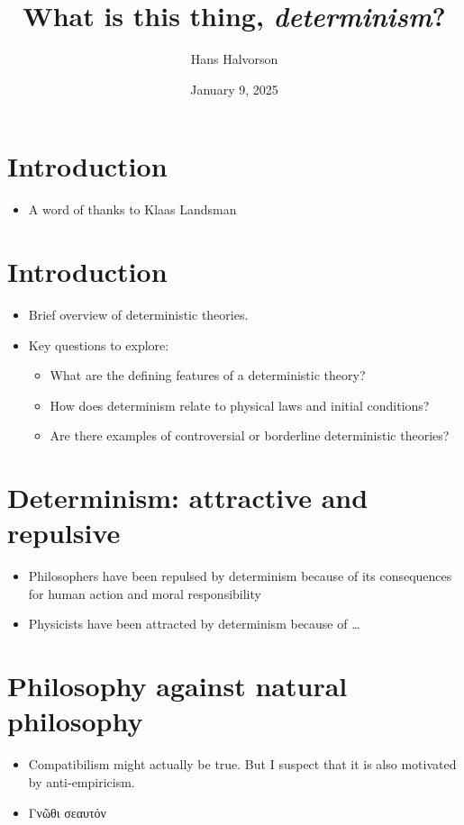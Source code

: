 \documentclass[11pt]{article}
\author{Hans Halvorson}
\date{January 9, 2025}
\title{What is this thing, \emph{determinism}?}
\begin{document}
\maketitle
\tableofcontents


\section{Introduction}
\label{sec:org58a1aa1}
\begin{itemize}
\item A word of thanks to Klaas Landsman
\end{itemize}

\section{Introduction}
\label{sec:org0e474f4}
\begin{itemize}
\item Brief overview of deterministic theories.
\item Key questions to explore:
\begin{itemize}
\item What are the defining features of a deterministic theory?
\item How does determinism relate to physical laws and initial conditions?
\item Are there examples of controversial or borderline deterministic theories?
\end{itemize}
\end{itemize}

\section{Determinism: attractive and repulsive}
\label{sec:orge2fcec0}
\begin{itemize}
\item Philosophers have been repulsed by determinism because of its
consequences for human action and moral responsibility
\item Physicists have been attracted by determinism because of \ldots{}
\end{itemize}

\section{Philosophy against natural philosophy}
\label{sec:org974db07}
\begin{itemize}
\item Compatibilism might actually be true. But I suspect that it is
also motivated by anti-empiricism.
\item Γνῶθι σεαυτόν
\end{itemize}
\end{document}
